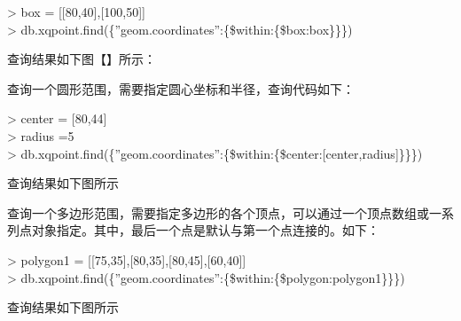 \documentclass[master]{njnuthesis}
\begin{document}
\noindent > box = [[80,40],[100,50]]\\
> db.xqpoint.find(\{''geom.coordinates'':\{\$within:\{\$box:box\}\}\})

查询结果如下图【】所示：

查询一个圆形范围，需要指定圆心坐标和半径，查询代码如下：

\noindent > center = [80,44]\\
> radius =5\\
> db.xqpoint.find(\{''geom.coordinates'':\{\$within:\{\$center:[center,radius]\}\}\})

查询结果如下图所示

    查询一个多边形范围，需要指定多边形的各个顶点，可以通过一个顶点数组或一系列点对象指定。其中，最后一个点是默认与第一个点连接的。如下：

\noindent > polygon1 = [[75,35],[80,35],[80,45],[60,40]]\\
> db.xqpoint.find(\{''geom.coordinates'':\{\$within:\{\$polygon:polygon1\}\}\})

查询结果如下图所示
\end{document}
